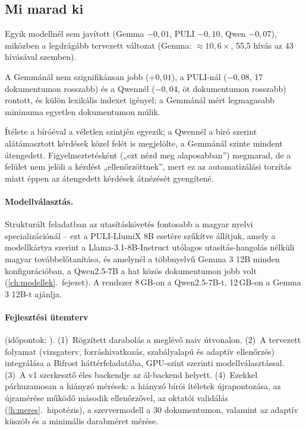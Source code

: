\subsection*{Mi marad ki}

\begin{description}[style=nextline,leftmargin=0.6cm]
\item[Fogalomgráf (\arm{E3}).] Egyik modellnél sem javított (Gemma $-0{,}01$, PULI $-0{,}10$, Qwen $-0{,}07$),
miközben a legdrágább tervezett változat (Gemma: $\approx10{,}6\times$, 55,5 hívás az  43 hívásával szemben).
\item[Hibrid keresés (\arm{E2h}).] A Gemmánál nem szignifikánsan jobb ($+0{,}01$), a PULI-nál ($-0{,}08$, 17
dokumentumon rosszabb) és a Qwennél ($-0{,}04$, öt dokumentumon rosszabb) rontott, és külön lexikális indexet
igényel; a Gemmánál mért legmagasabb minimuma egyetlen dokumentumon múlik.
\item[Az LLM-alapú ellenőrzés mint kérdésenkénti ítélet.] Ítélete a bíróéval a véletlen szintjén egyezik; a
Qwennél a bíró szerint alátámasztott kérdések közel felét is megjelölte, a Gemmánál szinte mindent
átengedett. Figyelmeztetésként („ezt nézd meg alaposabban”) megmarad, de a felület nem jelöli a kérdést
„ellenőrzöttnek”, mert ez az automatizálási torzítás~\cite{parasuraman2010complacency} miatt éppen az
átengedett kérdések átnézését gyengítené.
\end{description}

\paragraph{Modellválasztás.} Strukturált feladatban az utasításkövetés fontosabb a magyar nyelvi
specializációnál -- ezt a PULI-LlumiX 8B esetére szűkítve állítjuk, amely a modellkártya szerint a
Llama-3.1-8B-Instruct utólagos utasítás-hangolás nélküli magyar továbbelőtanítása, és amelynél a többnyelvű
Gemma 3 12B minden konfigurációban, a Qwen2.5-7B a hat közös dokumentumon jobb volt
(\ref{ch:modellek}.~fejezet). A rendszer 8\,GB-on a Qwen2.5-7B-t, 12\,GB-on a Gemma 3 12B-t ajánlja.

\paragraph{Fejlesztési ütemterv} (időpontok: ).
(1)~Rögzített darabolás a meglévő naiv útvonalon. (2)~A tervezett folyamat (vizsgaterv, forráshivatkozás,
szabályalapú és adaptív ellenőrzés) integrálása a Bifrost háttérfeladatába, GPU-szint szerinti
modellválasztással. (3)~A v1 szerkesztő éles backendje az ál-backend helyett. (4)~Ezekkel párhuzamosan a
hiányzó mérések: a hiányzó bírói ítéletek újrapontozása, az  újramérése működő második
ellenőrzővel, az oktatói validálás (\ref{h:meres}.~hipotézis), a szervermodell a 30 dokumentumon, valamint az
adaptív küszöb és a minimális darabméret mérése.

